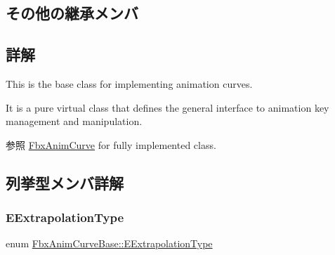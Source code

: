 \subsection*{その他の継承メンバ}


\subsection{詳解}
This is the base class for implementing animation curves.

It is a pure virtual class that defines the general interface to animation key management and manipulation.

\begin{DoxySeeAlso}{参照}
\hyperlink{class_fbx_anim_curve}{Fbx\+Anim\+Curve} for fully implemented class. 
\end{DoxySeeAlso}


\subsection{列挙型メンバ詳解}
\mbox{\label{class_fbx_anim_curve_base_aa7214d43daa7b6b9b47a8118a858847f}} 
\subsubsection{\texorpdfstring{E\+Extrapolation\+Type}{EExtrapolationType}}
{\footnotesize\ttfamily enum \hyperlink{class_fbx_anim_curve_base_aa7214d43daa7b6b9b47a8118a858847f}{Fbx\+Anim\+Curve\+Base\+::\+E\+Extrapolation\+Type}}

